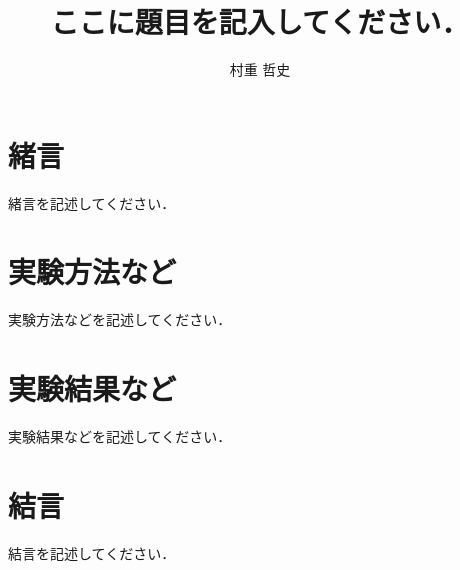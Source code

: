 \documentclass{advanced}
\title{ここに題目を記入してください．}
\author{村重 哲史\footnotemark}
\begin{document}
\maketitle
{}

\section{緒言}

緒言を記述してください．

\section{実験方法など}

実験方法などを記述してください．

\section{実験結果など}

実験結果などを記述してください．

\section{結言}

結言を記述してください．
\end{document}
